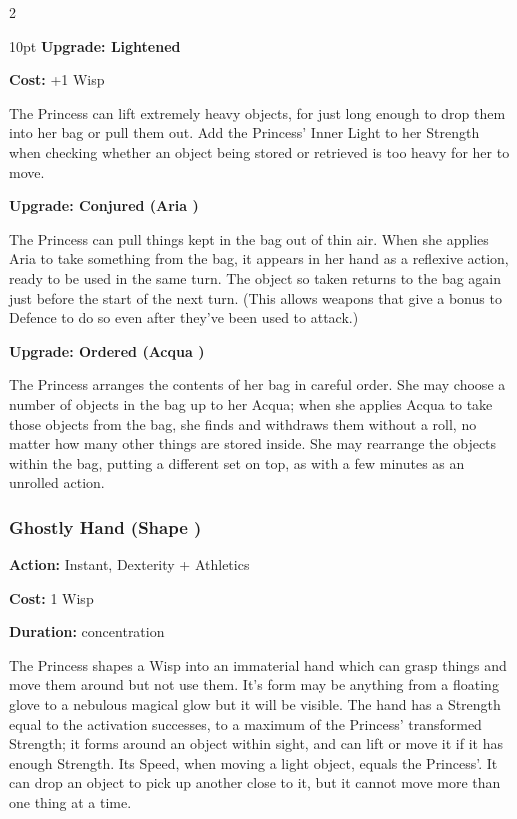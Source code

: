 \begin{multicols}{2}
\begin{myindentpar}{10pt}
\textbf{Upgrade: Lightened}

\noindent \textbf{Cost:} +1 Wisp

The Princess can lift extremely heavy objects, for just long enough to drop them into her bag or pull them out. Add the Princess' Inner Light to her Strength when checking whether an object being stored or retrieved is too heavy for her to move.

\textbf{Upgrade: Conjured (Aria \textbullet\textbullet)}

The Princess can pull things kept in the bag out of thin air. When she applies Aria to take something from the bag, it appears in her hand as a reflexive action, ready to be used in the same turn. The object so taken returns to the bag again just before the start of the next turn. (This allows weapons that give a bonus to Defence to do so even after they've been used to attack.)

\textbf{Upgrade: Ordered (Acqua \textbullet\textbullet)}

The Princess arranges the contents of her bag in careful order. She may choose a number of objects in the bag up to her Acqua; when she applies Acqua to take those objects from the bag, she finds and withdraws them without a roll, no matter how many other things are stored inside. She may rearrange the objects within the bag, putting a different set on top, as with a few minutes as an unrolled action.\end{myindentpar}

\subsubsection*{Ghostly Hand (Shape \textbullet\textbullet)}

\noindent \textbf{Action:} Instant, Dexterity + Athletics

\noindent \textbf{Cost:} 1 Wisp

\noindent \textbf{Duration:} concentration

The Princess shapes a Wisp into an immaterial hand which can grasp things and move them around but not use them. It's form may be anything from a floating glove to a nebulous magical glow but it will be visible. The hand has a Strength equal to the activation successes, to a maximum of the Princess' transformed Strength; it forms around an object within sight, and can lift or move it if it has enough Strength. Its Speed, when moving a light object, equals the Princess'. It can drop an object to pick up another close to it, but it cannot move more than one thing at a time.


\end{multicols}

